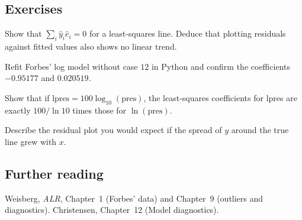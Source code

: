\subsection{Exercises}
\begin{problem}\label{prob:L06-1}
Show that $\sum_i \hat y_i\hat e_i=0$ for a least-squares line. Deduce that plotting residuals against fitted values also shows no linear trend.
\end{problem}
\begin{problem}\label{prob:L06-2}
Refit Forbes' log model without case $12$ in Python and confirm the coefficients $-0.95177$ and $0.020519$.
\end{problem}
\begin{problem}\label{prob:L06-3}
Show that if $\text{lpres}=100\log_{10}(\text{pres})$, the least-squares coefficients for lpres are exactly $100/\ln 10$ times those for $\ln(\text{pres})$.
\end{problem}
\begin{problem}\label{prob:L06-4}
Describe the residual plot you would expect if the spread of $y$ around the true line grew with $x$.
\end{problem}

\subsection{Further reading}
Weisberg, \emph{ALR}, Chapter~1 (Forbes' data) and Chapter~9 (outliers and diagnostics).
Christensen, Chapter~12 (Model diagnostics).
